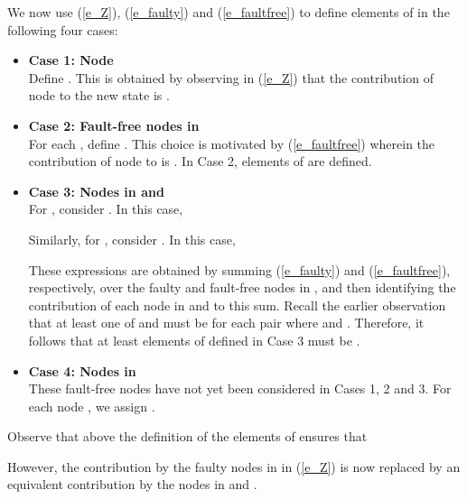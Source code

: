 \documentclass[letterpaper, 12pt]{article}
\begin{document}
We now use (\ref{e_Z}), (\ref{e_faulty}) and (\ref{e_faultfree}) to define elements
of  in the following four cases:
\begin{itemize}
\item {\bf Case 1: Node }\\ Define . This is obtained by observing in (\ref{e_Z}) that
the contribution of node  to the new state  is .
\item {\bf Case 2: Fault-free nodes in }\\
For each ,
define . This choice is motivated by (\ref{e_faultfree})
wherein the contribution of node  to  is .
In Case 2,  elements
of  are defined.
\item {\bf Case 3: Nodes in  and }\\ For , consider . In this
case, 

Similarly, for , consider . In this
case, 

These expressions are obtained by summing (\ref{e_faulty})
and (\ref{e_faultfree}), respectively, over the faulty and fault-free nodes
in , and then identifying the contribution
of each node in  and  to this sum.
Recall the earlier observation that at least one of 
and  must be  for each pair  where 
and .
Therefore, it follows that
at least  elements of  defined
in Case 3 must be .

\item {\bf Case 4: Nodes in }\\
These fault-free nodes have not yet been considered in Cases 1, 2 and 3.
For each node ,
we assign . 
\end{itemize}
Observe that above the definition of the elements of 
ensures that 

However, the contribution by the
faulty nodes in  in (\ref{e_Z}) is
now replaced by an
equivalent contribution by the nodes in  and .
\end{document}
